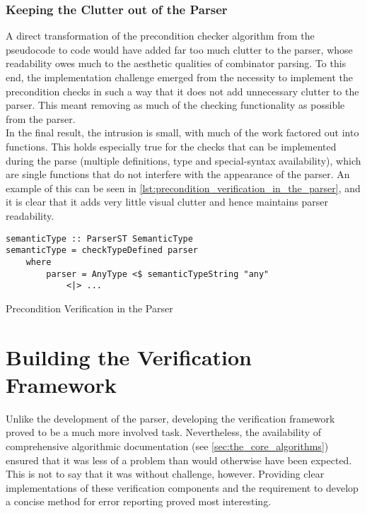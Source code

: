 
\subsubsection{Keeping the Clutter out of the Parser} %
\label{ssub:keeping_the_clutter_out_of_the_parser}
A direct transformation of the precondition checker algorithm from the pseudocode to code would have added far too much clutter to the parser, whose readability owes much to the aesthetic qualities of combinator parsing. 
To this end, the implementation challenge emerged from the necessity to implement the precondition checks in such a way that it does not add unnecessary clutter to the parser.
This meant removing as much of the checking functionality as possible from the parser. \\

In the final result, the intrusion is small, with much of the work factored out into functions. 
This holds especially true for the checks that can be implemented during the parse (multiple definitions, type and special-syntax availability), which are single functions that do not interfere with the appearance of the parser.
An example of this can be seen in \autoref{lst:precondition_verification_in_the_parser}, and it is clear that it adds very little visual clutter and hence maintains parser readability.

\begin{listing}[!htb]
\begin{verbatim}
semanticType :: ParserST SemanticType
semanticType = checkTypeDefined parser
    where
        parser = AnyType <$ semanticTypeString "any"
            <|> ...
\end{verbatim}
\caption{Precondition Verification in the Parser}
\label{lst:precondition_verification_in_the_parser}
\end{listing}




\section{Building the Verification Framework} %
\label{sec:building_the_verification_framework}
Unlike the development of the parser, developing the verification framework proved to be a much more involved task. 
Nevertheless, the availability of comprehensive algorithmic documentation (see \autoref{sec:the_core_algorithms}) ensured that it was less of a problem than would otherwise have been expected.
This is not to say that it was without challenge, however.
Providing clear implementations of these verification components and the requirement to develop a concise method for error reporting proved most interesting.\\

